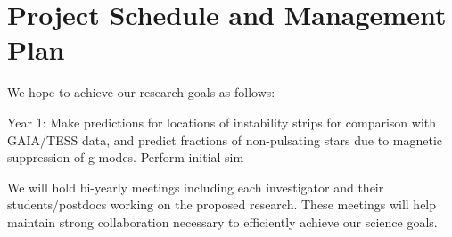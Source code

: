 \section{Project Schedule and Management Plan}

We hope to achieve our research goals as follows:

Year 1: Make predictions for locations of instability strips for comparison with GAIA/TESS data, and predict fractions of non-pulsating stars due to magnetic suppression of g modes. Perform initial sim 

We will  hold bi-yearly meetings including each investigator and their students/postdocs working on the proposed research. These meetings will help maintain strong collaboration necessary to efficiently achieve our science goals.
